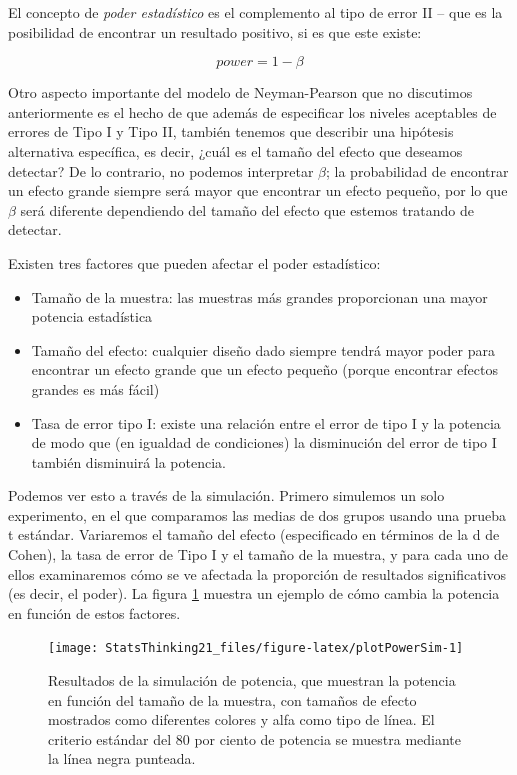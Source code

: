 \documentclass[
  12pt,
]{book}
\providecommand{\tightlist}{%
  \setlength{\itemsep}{0pt}\setlength{\parskip}{0pt}}
\begin{document}
El concepto de \emph{poder estadístico} es el complemento al tipo de error II -- que es la posibilidad de encontrar un resultado positivo, si es que este existe:

\[ 
power = 1 - \beta
\]

Otro aspecto importante del modelo de Neyman-Pearson que no discutimos anteriormente es el hecho de que además de especificar los niveles aceptables de errores de Tipo I y Tipo II, también tenemos que describir una hipótesis alternativa específica, es decir, ¿cuál es el tamaño del efecto que deseamos detectar? De lo contrario, no podemos interpretar \(\beta\); la probabilidad de encontrar un efecto grande siempre será mayor que encontrar un efecto pequeño, por lo que \(\beta\) será diferente dependiendo del tamaño del efecto que estemos tratando de detectar.

Existen tres factores que pueden afectar el poder estadístico:

\begin{itemize}
\tightlist
\item
  Tamaño de la muestra: las muestras más grandes proporcionan una mayor potencia estadística
\item
  Tamaño del efecto: cualquier diseño dado siempre tendrá mayor poder para encontrar un efecto grande que un efecto pequeño (porque encontrar efectos grandes es más fácil)
\item
  Tasa de error tipo I: existe una relación entre el error de tipo I y la potencia de modo que (en igualdad de condiciones) la disminución del error de tipo I también disminuirá la potencia.
\end{itemize}

Podemos ver esto a través de la simulación. Primero simulemos un solo experimento, en el que comparamos las medias de dos grupos usando una prueba t estándar. Variaremos el tamaño del efecto (especificado en términos de la d de Cohen), la tasa de error de Tipo I y el tamaño de la muestra, y para cada uno de ellos examinaremos cómo se ve afectada la proporción de resultados significativos (es decir, el poder). La figura \ref{fig:plotPowerSim} muestra un ejemplo de cómo cambia la potencia en función de estos factores.

\begin{figure}
\texttt{[image: StatsThinking21\_files/figure-latex/plotPowerSim-1]} \caption{Resultados de la simulación de potencia, que muestran la potencia en función del tamaño de la muestra, con tamaños de efecto mostrados como diferentes colores y alfa como tipo de línea. El criterio estándar del 80 por ciento de potencia se muestra mediante la línea negra punteada.}\label{fig:plotPowerSim}
\end{figure}
\end{document}
